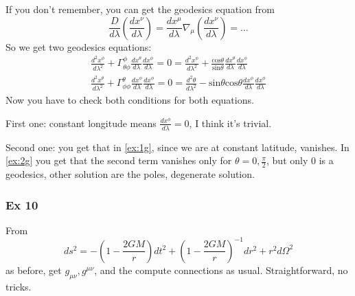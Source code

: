 If you don't remember, you can get the geodesics equation from
\[
\frac{D}{d\lambda }\left( \frac{dx^{\nu }}{d\lambda } \right) = \frac{d x^{\mu }}{d \lambda }\nabla _{\mu }\left( \frac{d x^{\nu }}{d \lambda } \right) = \ldots 
\]
So we get two geodesics equations:
\begin{gather}
	\frac{d ^{2}x^{\phi }}{d \lambda ^{2}} + \Gamma ^{\phi }_{\theta \phi }\frac{d x^{\theta }}{d \lambda }\frac{d x^{\phi }}{d \lambda } =0  = \frac{d ^{2}x^{\phi }}{d \lambda ^{2}} + \frac{\text{cos}\theta }{\text{sin}\theta }\frac{d x^{\theta }}{d \lambda }\frac{d x^{\phi }}{d \lambda } \label{ex:1g}\\
	\frac{d^{2}x^{\theta }}{d\lambda ^{2}} + \Gamma ^{\theta }_{\phi \phi }\frac{d x^{\phi }}{d \lambda }\frac{d x^{\phi }}{d \lambda } = 0  = \frac{d ^{2}\theta }{d \lambda ^{2}} - \text{sin}\theta \text{cos}\theta \frac{d x^{\phi }}{d \lambda }\frac{d x^{\phi }}{d \lambda }\label{ex:2g}
\end{gather}
Now you have to check both conditions for both equations.\par
First one: constant longitude means $\frac{d x^{\phi }}{d \lambda } = 0$, I think it's trivial. \par
Second one: you get that in \ref{ex:1g}, since we are at constant latitude, vanishes. In \ref{ex:2g} you get that the second term vanishes only for $\theta =0 , \frac{\pi }{2}$, but only 0 is a geodesics, other solution are the poles, degenerate solution. 

\subsubsection{Ex 10}
From 
\[
ds^{2 } = -\left( 1- \frac{2GM}{r} \right)dt^{2} + \left( 1 - \frac{2GM}{r} \right)^{-1}dr^{2} + r^{2}d\Omega ^{2}
\]
as before, get $g_{\mu \nu }, g^{\mu \nu }$, and the compute connections as usual. Straightforward, no tricks.

